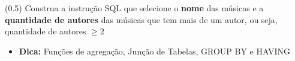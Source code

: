 \documentclass[12pt]{exam}
\begin{document}
\begin{questions}

\question (0.5) Construa a instrução SQL que selecione o \textbf{nome} das músicas e a \textbf{quantidade de autores} das músicas que tem mais de um autor, ou seja, quantidade de autores $\geq 2$

\begin{itemize}
    \item \textbf{Dica:} Funções de agregação, Junção de Tabelas, GROUP BY e HAVING
\end{itemize}



\end{questions}
\end{document}
